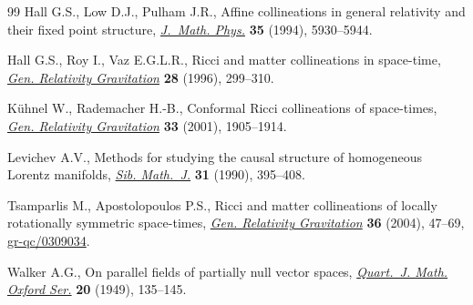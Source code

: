\documentclass[pdftex]{sigma}
\numberwithin{equation}{section}
\begin{document}
\begin{thebibliography}{99}
Hall G.S., Low D.J., Pulham J.R., Af\/f\/ine collineations in general relativity
 and their f\/ixed point structure, \href{http://dx.doi.org/10.1063/1.530720}{\textit{J.~Math. Phys.}} \textbf{35} (1994),
 5930--5944.

Hall G.S., Roy I., Vaz E.G.L.R., Ricci and matter collineations in space-time,
 \href{http://dx.doi.org/10.1007/BF02106969}{\textit{Gen. Relativity Gravitation}} \textbf{28} (1996), 299--310.

K{\"u}hnel W., Rademacher H.-B., Conformal {R}icci collineations of space-times,
 \href{http://dx.doi.org/10.1023/A:1013091621037}{\textit{Gen. Relativity Gravitation}} \textbf{33} (2001), 1905--1914.

Levichev A.V., Methods for studying the causal structure of homogeneous
 {L}orentz manifolds, \href{http://dx.doi.org/10.1007/BF00970346}{\textit{Sib. Math.~J.}} \textbf{31} (1990), 395--408.

Tsamparlis M., Apostolopoulos P.S., Ricci and matter collineations of locally
 rotationally symmetric space-times, \href{http://dx.doi.org/10.1023/B:GERG.0000006693.75816.e9}{\textit{Gen. Relativity Gravitation}}
 \textbf{36} (2004), 47--69, \href{http://arxiv.org/abs/gr-qc/0309034}{gr-qc/0309034}.

Walker A.G., On parallel f\/ields of partially null vector spaces,
 \href{http://dx.doi.org/10.1093/qmath/os-20.1.135}{\textit{Quart.~J. Math. Oxford Ser.}} \textbf{20} (1949), 135--145.

\end{thebibliography}\LastPageEnding
\end{document}
